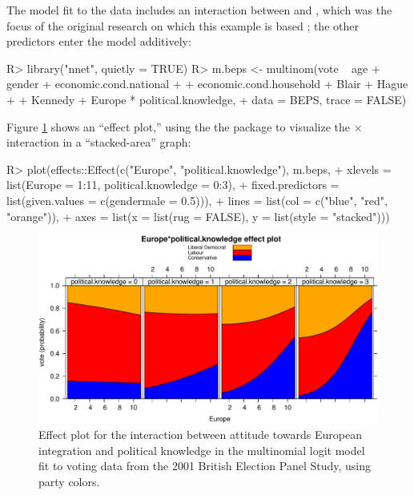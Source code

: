 \documentclass[
]{jss}
\begin{document}
The model fit to the data includes an interaction between 
and , which was the focus of the original
research on which this example is based
\citep{AndersenHeathSinnott:2002}; the other predictors enter the model
additively:

\begin{CodeChunk}
\begin{CodeInput}
R> library("nnet", quietly = TRUE)
R> m.beps <- multinom(vote ~ age + gender + economic.cond.national
+                         + economic.cond.household + Blair + Hague
+                         + Kennedy + Europe * political.knowledge,
+                    data = BEPS, trace = FALSE)
\end{CodeInput}
\end{CodeChunk}

Figure \ref{fig:BEPS-plot} shows an ``effect plot,'' using the the
 package \citep{FoxWeisberg:2019} to visualize the
 \(\times\)  interaction in a
``stacked-area'' graph:

\begin{CodeChunk}
\begin{CodeInput}
R> plot(effects::Effect(c("Europe", "political.knowledge"), m.beps,
+             xlevels = list(Europe = 1:11, political.knowledge = 0:3),
+             fixed.predictors = list(given.values = c(gendermale = 0.5))),
+      lines = list(col = c("blue", "red", "orange")),
+      axes = list(x = list(rug = FALSE), y = list(style = "stacked")))
\end{CodeInput}
\begin{figure}

{\centering \includegraphics{Figures/BEPS-plot-1}

}

\caption[Effect plot for the interaction between attitude towards European integration and political knowledge in the multinomial logit model fit to voting data from the 2001 British Election Panel Study, using party colors]{Effect plot for the interaction between attitude towards European integration and political knowledge in the multinomial logit model fit to voting data from the 2001 British Election Panel Study, using party colors.}\label{fig:BEPS-plot}
\end{figure}
\end{CodeChunk}
\end{document}
